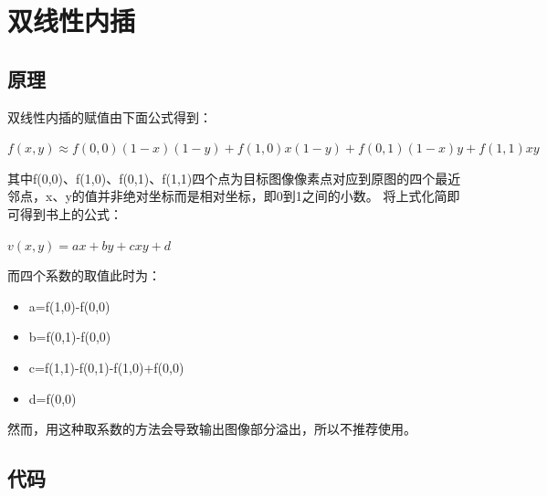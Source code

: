 \documentclass{article}
\begin{document}
\section{双线性内插}

\subsection{原理}
双线性内插的赋值由下面公式得到：

$f(x,y) \approx f(0,0)(1-x)(1-y)+f(1,0)x(1-y)+f(0,1)(1-x)y+f(1,1)xy$

其中f(0,0)、f(1,0)、f(0,1)、f(1,1)四个点为目标图像像素点对应到原图的四个最近邻点，x、y的值并非绝对坐标而是相对坐标，即0到1之间的小数。
将上式化简即可得到书上的公式：

\begin{math}
v(x,y)=ax+by+cxy+d
\end{math}

而四个系数的取值此时为：
\begin{itemize}
\item a=f(1,0)-f(0,0)
\item b=f(0,1)-f(0,0)
\item c=f(1,1)-f(0,1)-f(1,0)+f(0,0)
\item d=f(0,0)
\end{itemize}
然而，用这种取系数的方法会导致输出图像部分溢出，所以不推荐使用。
\newpage
\subsection{代码}
\end{document}
